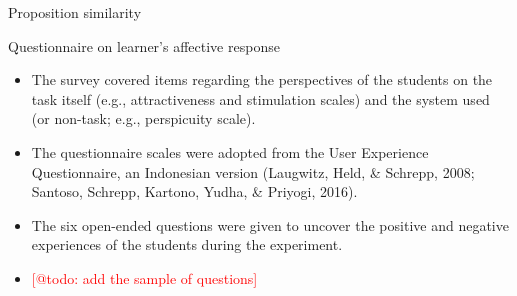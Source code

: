 \begin{frame}{Proposition similarity}

\end{frame}

\begin{frame}{Questionnaire on learner's affective response}
    \begin{itemize}
        \item The survey covered items regarding the perspectives of 
              the students on the task itself (e.g., attractiveness 
              and stimulation scales) and the system used (or non-task; 
              e.g., perspicuity scale). 
        \item The questionnaire scales were adopted from the User Experience
              Questionnaire, an Indonesian version (Laugwitz, Held, \& Schrepp, 2008;
              Santoso, Schrepp, Kartono, Yudha, \& Priyogi, 2016). 
        \item The six open-ended questions were given to uncover the positive and
              negative experiences of the students during the experiment.
        \item \textcolor{red}{[@todo: add the sample of questions]}
    \end{itemize}
\end{frame}

